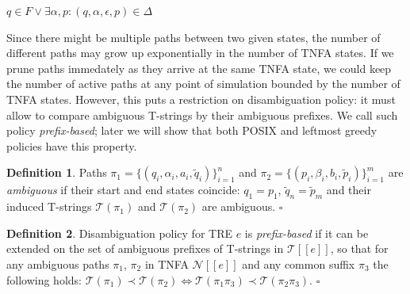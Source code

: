 \documentclass{article}
\newcommand{\Xin}{\!\in\!}
\newcommand{\Xeq}{\!=\!}
\newcommand{\Xlb}{[\![}
\newcommand{\Xrb}{]\!]}
\newcommand{\XN}{\mathcal{N}}
\newcommand{\XT}{\mathcal{T}}
\theoremstyle{definition}
\newtheorem{Xdef}{Definition}
\begin{document}
\begin{multicols}{2}
    \begin{algorithm}[H] \DontPrintSemicolon {} 
     {
        \Return $q \Xin F \vee \exists \alpha, p: (q, \alpha, \epsilon, p) \Xin \Delta$
    }
    \end{algorithm}

Since there might be multiple paths between two given states,
the number of different paths may grow up exponentially in the number of TNFA states.
If we prune paths immedately as they arrive at the same TNFA state,
we could keep the number of active paths at any point of simulation bounded by the number of TNFA states.
However, this puts a restriction on disambiguation policy:
it must allow to compare ambiguous T-strings by their ambiguous prefixes.
We call such policy \emph{prefix-based};
later we will show that both POSIX and leftmost greedy policies have this property.

    \begin{Xdef}
    Paths
    $\pi_1 \Xeq \{(q_i, \alpha_i, a_i, \widetilde{q}_i)\}_{i=1}^n$ and
    $\pi_2 \Xeq \{(p_i, \beta_i, b_i, \widetilde{p}_i)\}_{i=1}^m$
    are \emph{ambiguous} if their start and end states coincide: $q_1 \Xeq p_1$, $\widetilde{q}_n \Xeq \widetilde{p}_m$
    and their induced T-strings $\XT(\pi_1)$ and $\XT(\pi_2)$ are ambiguous.
    $\square$
    \end{Xdef}

    \begin{Xdef}
    Disambiguation policy for TRE $e$ is \emph{prefix-based}
    if it can be extended on the set of ambiguous prefixes of T-strings in $\XT \Xlb e \Xrb$,
    so that for any ambiguous paths $\pi_1 $, $\pi_2 $ in TNFA $\XN \Xlb e \Xrb$
    and any common suffix $\pi_3$ the following holds:
    $\XT(\pi_1) \prec \XT(\pi_2) \Leftrightarrow \XT(\pi_1 \pi_3) \prec \XT(\pi_2 \pi_3)$.
    $\square$
    \end{Xdef}


\end{multicols}
\end{document}
